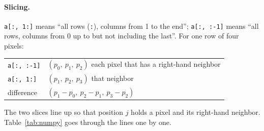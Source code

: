 \documentclass[11pt,letterpaper]{article}
\newcommand{\code}[1]{\texttt{#1}}
\begin{document}
\paragraph{Slicing.}  \code{a[:, 1:]} means ``all rows (\code{:}),
columns from 1 to the end''; \code{a[:, :-1]} means ``all rows, columns from
0 up to but not including the last''.  For one row of four pixels:
\begin{center}\small
\begin{tabular}{@{}ll@{}}
\code{a[:, :-1]} & $(p_0,\ p_1,\ p_2)$ \quad each pixel that has a right-hand neighbor \\
\code{a[:, 1:]}  & $(p_1,\ p_2,\ p_3)$ \quad that neighbor \\
difference       & $(p_1 - p_0,\ p_2 - p_1,\ p_3 - p_2)$
\end{tabular}
\end{center}
The two slices line up so that position $j$ holds a pixel and its right-hand
neighbor.  Table~\ref{tab:numpy} goes through the lines one by one.
\end{document}
